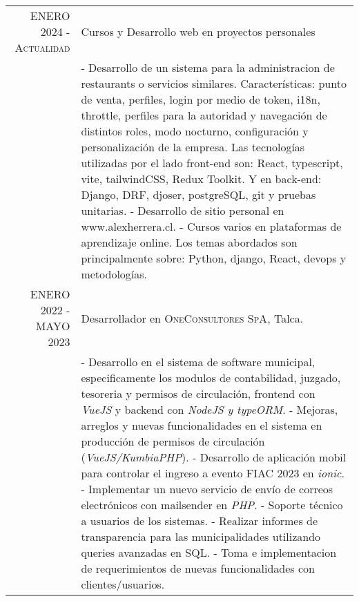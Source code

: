 \documentclass[a4paper,10pt]{article} %
\begin{document}
\begin{tabular}{r|p{11cm}}

\textsc{ENERO 2024 - Actualidad} & Cursos y Desarrollo web en proyectos personales \emph{}\\
& \footnotesize{
    - Desarrollo de un sistema para la administracion de restaurants o servicios similares. Caracter\'isticas: punto de venta, perfiles, login por medio de token, i18n, throttle, perfiles para la autoridad y navegaci\'on de distintos roles, modo nocturno, configuraci\'on y personalizaci\'on de la empresa. Las tecnolog\'ias utilizadas por el lado front-end son: React, typescript, vite, tailwindCSS, Redux Toolkit. Y en back-end: Django, DRF, djoser, postgreSQL, git y pruebas unitarias.\newline
    - Desarrollo de sitio personal en www.alexherrera.cl.\newline
    - Cursos varios en plataformas de aprendizaje online. Los temas abordados son principalmente sobre: Python, django, React, devops y metodolog\'ias.
}
\multicolumn{2}{c}{} \\

\textsc{ENERO 2022 - MAYO 2023} & Desarrollador en \textsc{OneConsultores SpA}, Talca. \emph{}\\
& \footnotesize{
    - Desarrollo en el sistema de software municipal, especificamente los modulos de contabilidad, juzgado, tesoreria y permisos de circulaci\'on, frontend con \textit{VueJS} y backend con \textit{NodeJS y typeORM}.\newline
    - Mejoras, arreglos y nuevas funcionalidades en el sistema en producci\'on de permisos de circulaci\'on (\textit{VueJS/KumbiaPHP}).\newline
    - Desarrollo de aplicaci\'on mobil para controlar el ingreso a evento FIAC 2023 en \textit{ionic}.\newline
    - Implementar un nuevo servicio de env\'io de correos electr\'onicos con mailsender en \textit{PHP}.\newline
    - Soporte t\'ecnico a usuarios de los sistemas.\newline
    - Realizar informes de transparencia para las municipalidades utilizando queries avanzadas en SQL.\newline
    - Toma e implementacion de requerimientos de nuevas funcionalidades con clientes/usuarios.
}
\multicolumn{2}{c}{} \\


\end{tabular}
\end{document}
